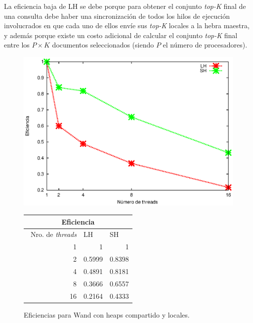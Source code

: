 La eficiencia baja de LH se debe porque para obtener el conjunto \textit{top-K} final de una consulta debe haber una sincronización de todos los hilos de ejecución involucrados en que cada uno de ellos envíe sus \textit{top-K} locales a la hebra maestra, y además porque existe un costo adicional de calcular el conjunto \textit{top-K} final entre los $P \times K$ documentos seleccionados (siendo $P$ el número de procesadores).


\begin{figure}[tp]
  \begin{minipage}[][][b]{0.5\linewidth}
    \centering
    \includegraphics[width=\linewidth]{images/eficiencias_wand_updated.eps}
  \end{minipage}%
  \begin{minipage}[b]{0.30\linewidth}
    		\centering
		\begin{tabular}{|r|r|r|}
		\hline
		\multicolumn{ 3}{|c|}{Eficiencia} \\ \hline
		\multicolumn{1}{|l|}{\ Nro. de \textit{threads}} & \multicolumn{1}{l|}{LH} & \multicolumn{1}{l|}{SH} \\ \hline
		1 & 1 & 1 \\ \hline
		2 & 0.5999 & 0.8398 \\ \hline
		4 & 0.4891 & 0.8181 \\ \hline
		8 & 0.3666 & 0.6557 \\ \hline
		16 & 0.2164 & 0.4333 \\ \hline
		\end{tabular}
   \end{minipage}
\caption{Eficiencias para Wand con heaps compartido y locales.}
\label{fig:eficiencias_wand}
\end{figure}

